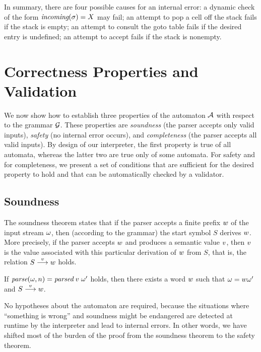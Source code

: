 \documentclass{llncs}
\begin{document}
In summary, there are four possible causes for an internal error: a dynamic
check of the form $\textit{incoming}(\sigma)=X$ may fail; an attempt to pop a cell off
the stack fails if the stack is empty; an attempt to consult the goto table
fails if the desired entry is undefined; an attempt to accept fails if the
stack is nonempty.

\section{Correctness Properties and Validation}
\label{sec:theorems}

We now show how to establish three properties of the automaton $\mathcal{A}$
with respect to the grammar $\mathcal{G}$. These properties are \emph{soundness}
(the parser accepts only valid inputs), \emph{safety} (no internal error
occurs), and \emph{completeness} (the parser accepts all valid inputs). By
design of our interpreter, the first property is true of all automata, whereas
the latter two are true only of some automata. For safety and for
completeness, we present a set of conditions that are sufficient for the
desired property to hold and that can be automatically checked by a validator.

\subsection{Soundness} 
\label{sec:soundness}

The soundness theorem states that if the parser accepts a finite prefix
$w$ of the input stream $\omega$, then (according to the grammar) the
start symbol $S$ derives $w$. More precisely, if the parser accepts
$w$ and produces a semantic value $v$, then $v$ is the value
associated with this particular derivation of $w$ from $S$, that is, the
relation $S\stackrel{v}{\longrightarrow}w$ holds.
%
\begin{theorem}[Soundness]
\label{th:sound}
If $\textit{parse}(\omega, n) = \textit{parsed}\;v\;\omega'$ holds, then there exists a
word $w$ such that $\omega = w \omega'$ and $S\stackrel{v}{\longrightarrow}w$.
\end{theorem}

No hypotheses about the automaton are required, because the situations where
``something is wrong'' and soundness might be endangered are detected at
runtime by the interpreter and lead to internal errors. In other words, we
have shifted most of the burden of the proof from the soundness theorem to the
safety theorem.
\end{document}
